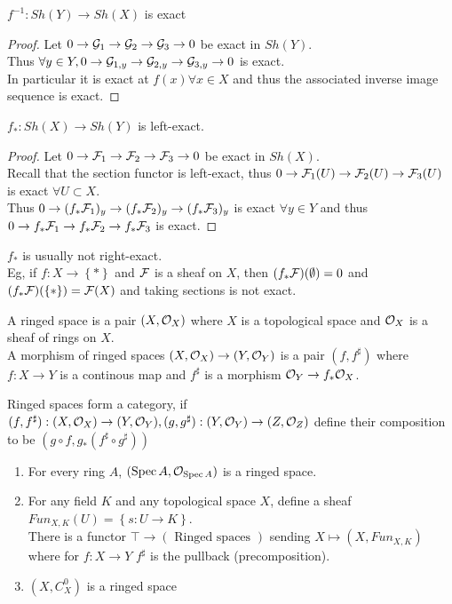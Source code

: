 \documentclass[../main.tex]{subfiles}
\begin{document}
\begin{crly}
$f^{-1}: Sh( Y) \to Sh( X) $ is exact
\end{crly}
\begin{proof}
Let $0 \to \mathcal{G}_1 \to \mathcal{G}_2 \to \mathcal{G}_3 \to 0$ be exact in $Sh( Y) $.\\
Thus $\forall y \in Y, 0 \to \mathcal{G}_{1,y} \to \mathcal{G}_{2,y} \to \mathcal{G}_{3,y} \to 0$ is exact.\\
In particular it is exact at $f( x) \forall x \in X$ and thus the associated inverse image sequence is exact.
\end{proof}
\begin{crly}
$f_{\ast} : Sh(X) \to Sh( Y) $ is left-exact.
\end{crly}
\begin{proof}
Let $0 \to \mathcal{F}_1 \to \mathcal{F}_2 \to \mathcal{F}_3 \to 0$ be exact in $Sh( X) $.\\
Recall that the section functor is left-exact, thus $0 \to \mathcal{F}_1( U) \to \mathcal{F}_2( U) \to \mathcal{F}_3( U) $ is exact $\forall U \subset X$.\\
Thus $0 \to ( f_{\ast} \mathcal{F}_1)_y  \to ( f_{\ast} \mathcal{F}_2)_y \to ( f_{\ast} \mathcal{F}_3)_y $ is exact $\forall y \in Y$ and thus $0 \to f_\ast\mathcal{F}_1\to f_\ast \mathcal{F}_2 \to f_\ast \mathcal{F}_3$ is exact.
\end{proof}
\begin{exemple}
$f_\ast$ is usually not right-exact.\\
Eg, if $f:X\to \left\{ \ast \right\} $ and $\mathcal{F}$ is a sheaf on $X$, then $( f_\ast \mathcal{F}) ( \emptyset) =0$ and $( f_\ast \mathcal{F}) ( \left\{ \ast \right\} ) = \mathcal{F}( X) $ and taking sections is not exact.
\end{exemple}
\begin{defn}
	A ringed space is a pair $( X, \mathcal{O}_X) $ where $X$ is a topological space and $\mathcal{O}_X$ is a sheaf of rings on $X$.\\
	A morphism of ringed spaces $( X,\mathcal{O}_X) \to ( Y,\mathcal{O}_Y) $ is a pair $( f,f^{\sharp}) $ where $f:X\to Y$ is a continous map and $f^{\sharp}$ is a morphism $\mathcal{O}_Y \to f_\ast \mathcal{O}_X$.
\end{defn}
\begin{rmq}
Ringed spaces form a category, if $( f,f^{\sharp}) : ( X,\mathcal{O}_X) \to ( Y,\mathcal{O}_Y) , ( g,g^{\sharp}) :( Y,\mathcal{O}_Y) \to ( Z,\mathcal{O}_Z) $ define their composition to be $( g\circ f , g_{\ast} ( f^{\sharp}\circ g^{\sharp}) ) $
\end{rmq}
\begin{exemple}
\begin{enumerate}
\item For every ring $A$, $( \operatorname{Spec} A, \mathcal{O}_{\operatorname{Spec} A} ) $ is a ringed space.
\item For any field $K$ and any topological space $X$, define a sheaf $Fun_{X,K} ( U) = \left\{ s: U \to K \right\} $.\\
	There is a functor $\top \to ( \text{ Ringed spaces } ) $ sending $X\mapsto ( X, Fun_{X,K} ) $ where for $f:X\to Y$ $f^{\sharp}$ is the pullback (precomposition).
\item  $( X,C^{0}_X) $ is a ringed space
\end{enumerate}
\end{exemple}
\end{document}
